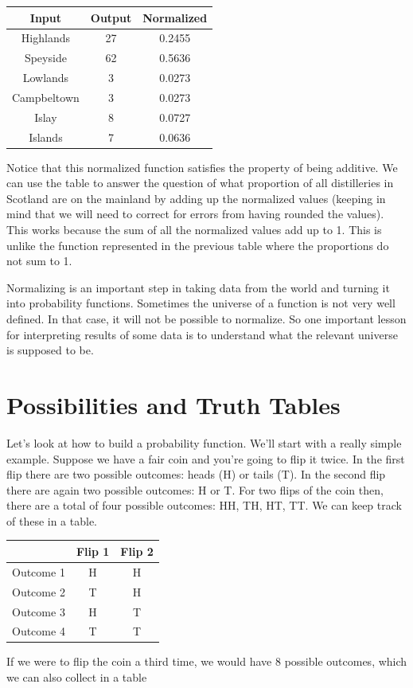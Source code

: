 \documentclass[]{tufte-book}
\begin{document}
\begin{longtable}[]{@{}ccc@{}}
\toprule
Input & Output & Normalized\tabularnewline
\midrule
\endhead
Highlands & 27 & 0.2455\tabularnewline
Speyside & 62 & 0.5636\tabularnewline
Lowlands & 3 & 0.0273\tabularnewline
Campbeltown & 3 & 0.0273\tabularnewline
Islay & 8 & 0.0727\tabularnewline
Islands & 7 & 0.0636\tabularnewline
\bottomrule
\end{longtable}

Notice that this normalized function satisfies the property of being additive. We can use the table to answer the question of what proportion of all distilleries in Scotland are on the mainland by adding up the normalized values (keeping in mind that we will need to correct for errors from having rounded the values). This works because the sum of all the normalized values add up to 1. This is unlike the function represented in the previous table where the proportions do not sum to 1.

Normalizing is an important step in taking data from the world and turning it into probability functions. Sometimes the universe of a function is not very well defined. In that case, it will not be possible to normalize. So one important lesson for interpreting results of some data is to understand what the relevant universe is supposed to be.

\hypertarget{possibilities-and-truth-tables}{%
\section{Possibilities and Truth Tables}\label{possibilities-and-truth-tables}}

Let's look at how to build a probability function. We'll start with a really simple example. Suppose we have a fair coin and you're going to flip it twice. In the first flip there are two possible outcomes: heads (H) or tails (T). In the second flip there are again two possible outcomes: H or T. For two flips of the coin then, there are a total of four possible outcomes: HH, TH, HT, TT. We can keep track of these in a table.

\begin{longtable}[]{@{}lcc@{}}
\toprule
& Flip 1 & Flip 2\tabularnewline
\midrule
\endhead
Outcome 1 & H & H\tabularnewline
Outcome 2 & T & H\tabularnewline
Outcome 3 & H & T\tabularnewline
Outcome 4 & T & T\tabularnewline
\bottomrule
\end{longtable}

If we were to flip the coin a third time, we would have 8 possible outcomes, which we can also collect in a table
\end{document}

